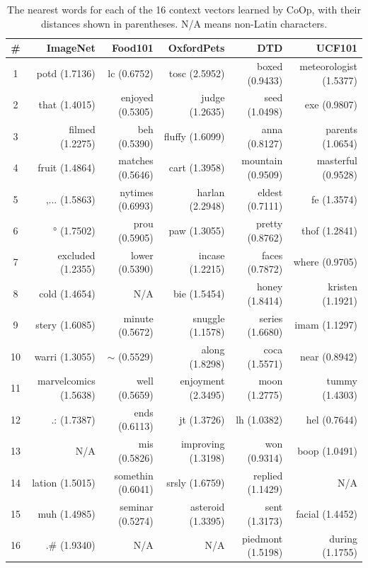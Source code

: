 \begin{table}[t]
    \tabstyle{1pt}
    \caption{The nearest words for each of the 16 context vectors learned by CoOp, with their distances shown in parentheses. N/A means non-Latin characters.}
    \label{tab:vis_ctx_vec}
    \begin{tabular}{c |r|r|r|r|r}
    \toprule
    \# & ImageNet & Food101 & OxfordPets & DTD & UCF101 \\
    \midrule
    1 & potd (1.7136) & lc (0.6752) & tosc (2.5952) & boxed (0.9433) & meteorologist (1.5377) \\
    2 & that (1.4015) & enjoyed (0.5305) & judge (1.2635) & seed (1.0498) & exe (0.9807) \\
    3 & filmed (1.2275) & beh (0.5390) & fluffy (1.6099) & anna (0.8127) & parents (1.0654) \\
    4 & fruit (1.4864) & matches (0.5646) & cart (1.3958) & mountain (0.9509) & masterful (0.9528) \\
    5 & ,... (1.5863) & nytimes (0.6993) & harlan (2.2948) & eldest (0.7111) & fe (1.3574) \\
    6 & ° (1.7502) & prou (0.5905) & paw (1.3055) & pretty (0.8762) & thof (1.2841) \\
    7 & excluded (1.2355) & lower (0.5390) & incase (1.2215) & faces (0.7872) & where (0.9705) \\
    8 & cold (1.4654) & N/A & bie (1.5454) & honey (1.8414) & kristen (1.1921) \\
    9 & stery (1.6085) & minute (0.5672) & snuggle (1.1578) & series (1.6680) & imam (1.1297) \\
    10 & warri (1.3055) & $\sim$ (0.5529) & along (1.8298) & coca (1.5571) & near (0.8942) \\
    11 & marvelcomics (1.5638) & well (0.5659) & enjoyment (2.3495) & moon (1.2775) & tummy (1.4303) \\
    12 & .: (1.7387) & ends (0.6113) & jt (1.3726) & lh (1.0382) & hel (0.7644) \\
    13 & N/A & mis (0.5826) & improving (1.3198) & won (0.9314) & boop (1.0491) \\
    14 & lation (1.5015) & somethin (0.6041) & srsly (1.6759) & replied (1.1429) & N/A \\
    15 & muh (1.4985) & seminar (0.5274) & asteroid (1.3395) & sent (1.3173) & facial (1.4452) \\
    16 & .\# (1.9340) & N/A & N/A & piedmont (1.5198) & during (1.1755) \\
    \bottomrule
    \end{tabular}
\end{table}

